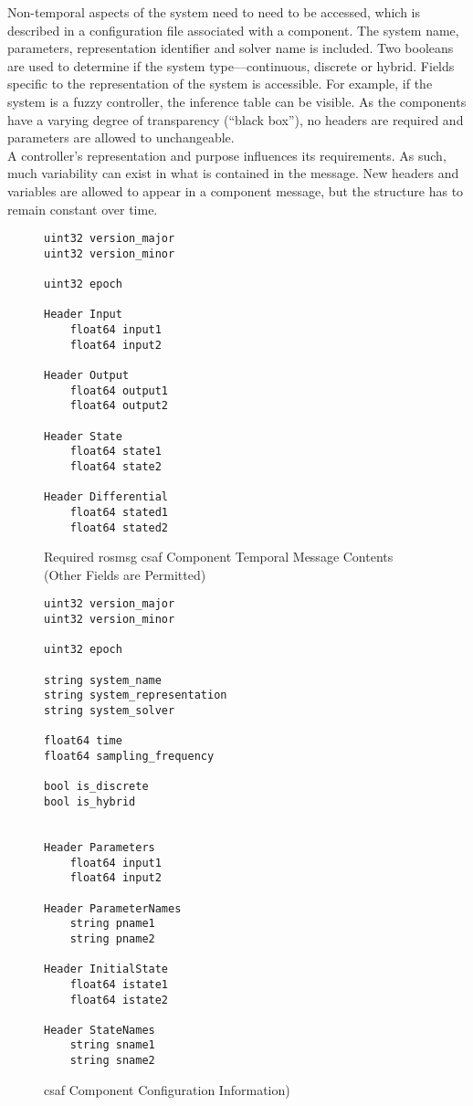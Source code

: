 Non-temporal aspects of the system need to need to be accessed, which is described in a configuration file associated with a component. The system name, parameters, representation identifier and solver name is included. Two booleans are used to determine if the system type---continuous, discrete or hybrid.  Fields specific to the representation of the system is  accessible. For example, if the system is a fuzzy controller, the inference table can be visible. As the  components have a varying degree of transparency (``black box''), no headers are required and parameters are allowed to unchangeable. \\

A controller's representation and purpose influences its requirements. As such, much 
variability can exist in what is contained in the message. New headers and variables are allowed to appear in a 
component message, but the structure has to remain constant over time. \\

\begin{figure}
\begin{lstlisting}
uint32 version_major
uint32 version_minor

uint32 epoch

Header Input
	float64 input1
	float64 input2
	
Header Output
	float64 output1
	float64 output2
	
Header State
	float64 state1
	float64 state2
	
Header Differential
	float64 stated1
	float64 stated2
\end{lstlisting}
\caption{Required \acrshort{ros}msg \acrshort{csaf}  Component Temporal Message Contents (Other Fields are Permitted)}
\label{fig:cmsg}
\end{figure}

\begin{figure}
\begin{lstlisting}
uint32 version_major
uint32 version_minor

uint32 epoch

string system_name
string system_representation
string system_solver

float64 time
float64 sampling_frequency

bool is_discrete
bool is_hybrid


Header Parameters
	float64 input1
	float64 input2
	
Header ParameterNames
	string pname1
	string pname2
	
Header InitialState
	float64 istate1
	float64 istate2
	
Header StateNames
	string sname1
	string sname2
\end{lstlisting}
\caption{ \acrshort{csaf}  Component Configuration Information)}
\label{fig:cmsg}
\end{figure}

